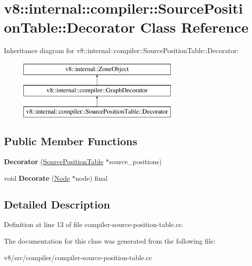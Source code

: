 \hypertarget{classv8_1_1internal_1_1compiler_1_1SourcePositionTable_1_1Decorator}{}\section{v8\+:\+:internal\+:\+:compiler\+:\+:Source\+Position\+Table\+:\+:Decorator Class Reference}
\label{classv8_1_1internal_1_1compiler_1_1SourcePositionTable_1_1Decorator}
Inheritance diagram for v8\+:\+:internal\+:\+:compiler\+:\+:Source\+Position\+Table\+:\+:Decorator\+:\begin{figure}[H]
\begin{center}
\leavevmode
\includegraphics[height=3.000000cm]{classv8_1_1internal_1_1compiler_1_1SourcePositionTable_1_1Decorator}
\end{center}
\end{figure}
\subsection*{Public Member Functions}
\begin{DoxyCompactItemize}
\item 
\mbox{\label{classv8_1_1internal_1_1compiler_1_1SourcePositionTable_1_1Decorator_a2c293d7dc3a966e3d179b1c385b81957}} 
{\bfseries Decorator} (\mbox{\hyperlink{classv8_1_1internal_1_1compiler_1_1SourcePositionTable}{Source\+Position\+Table}} $\ast$source\+\_\+positions)
\item 
\mbox{\label{classv8_1_1internal_1_1compiler_1_1SourcePositionTable_1_1Decorator_a179328e1909ec3a068a86748ac3b5d58}} 
void {\bfseries Decorate} (\mbox{\hyperlink{classv8_1_1internal_1_1compiler_1_1Node}{Node}} $\ast$node) final
\end{DoxyCompactItemize}


\subsection{Detailed Description}


Definition at line 13 of file compiler-\/source-\/position-\/table.\+cc.



The documentation for this class was generated from the following file\+:\begin{DoxyCompactItemize}
\item 
v8/src/compiler/compiler-\/source-\/position-\/table.\+cc\end{DoxyCompactItemize}
